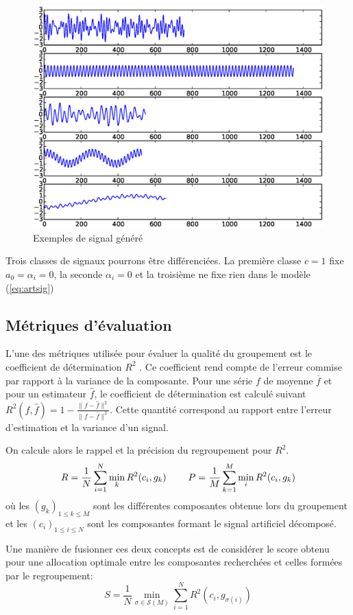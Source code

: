 \documentclass{gretsi}
\begin{document}
    \begin{figure}[htp]
\centering
\includegraphics[width=.5\textwidth]{img/artsig.eps}
\vspace{-.7cm}\caption{Exemples de signal généré}
\label{}
\end{figure}

Trois classes de signaux pourrons être différenciées. La première classe $c=1$ fixe $a_0 = \alpha_i = 0$, la seconde $\alpha_i = 0$ et la troisième ne fixe rien dans le modèle (\ref{eq:artsig})


\subsection{Métriques d'évaluation}
\label{sub:met}

L'une des métriques utilisée pour évaluer la qualité du groupement est le coefficient de détermination $R^2$ \cite{abalov_14_auto}. Ce coefficient rend compte de l'erreur commise par rapport à la variance de la composante. Pour une série $f$ de moyenne $\overline f$ et pour un estimateur $\widehat f$, le coefficient de détermination est calculé suivant $R^2(f, \widehat f) = 1 - \frac{\|f-\widehat f\|^2}{\|f-\overline f\|^2}$. Cette quantité correspond au rapport entre l'erreur d'estimation et la variance d'un signal. 

On calcule alors le rappel et la précision du regroupement pour $R^2$.
    $$
        R = \frac{1}{N} \sum_{i=1}^N \min_k R^2(c_i, g_k) \hspace{0.8cm} P = \frac{1}{M}\sum_{k=1}^M \min_i R^2(c_i, g_k)
    $$où les $(g_k)_{1\le k \le M}$ sont les différentes composantes obtenue lors du groupement et les $(c_i)_{1\le i\le N}$ sont les composantes formant le signal artificiel décomposé.
    
    Une manière de fusionner ces deux concepts est de considérer le score obtenu pour une allocation optimale entre les composantes recherchées et celles formées par le regroupement:$$
        S =  \frac{1}{N} \min_{\sigma \in \mathcal S(M)} \sum_{i=1}^N R^2(c_i, g_{\sigma(i)})
    $$
    
\end{document}
